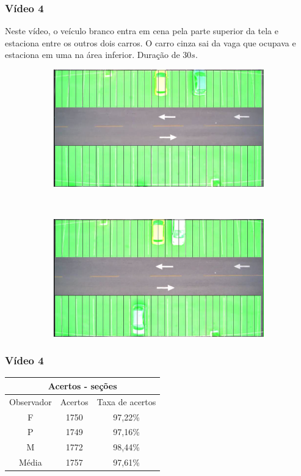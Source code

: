 \documentclass{beamer}
\begin{document}
\begin{frame}
\frametitle{Vídeo 4}

Neste vídeo, o veículo branco entra em cena pela parte superior da tela e estaciona entre os outros dois carros. O carro cinza sai da vaga que ocupava e estaciona em uma na área inferior. Duração de $30s$.

\begin{figure}
\centering
\begin{subfigure}{.5\textwidth}
\centering
\includegraphics[width=.5\linewidth]{Video4Inicio}
\end{subfigure}\
\begin{subfigure}{.5\textwidth}
\centering
\includegraphics[width=.5\linewidth]{Video4Fim}
\end{subfigure}
\centering
\end{figure}	
\end{frame}

\begin{frame}
	\frametitle{Vídeo 4}
\begin{center}
\begin{tabular}{|c||c||c|}
\hline
\multicolumn{3}{|c|}{Acertos - seções}  \\ \hline \hline
Observador & Acertos & Taxa de acertos \\ \hline
F & 1750 & 97,22\% \\  \hline
P & 1749 & 97,16\% \\ \hline
M & 1772 & 98,44\% \\ \hline
Média & 1757 & 97,61\% \\
\hline
\end{tabular}
\end{center}
\end{frame}
\end{document}
